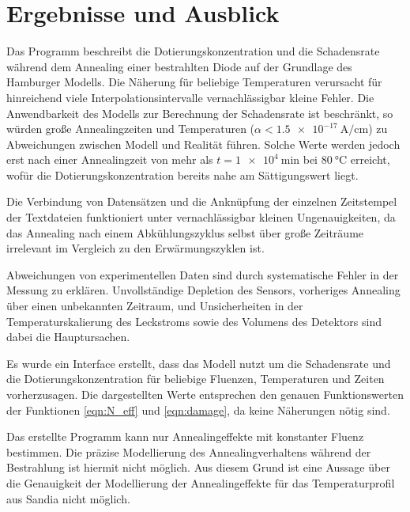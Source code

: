 \chapter{Ergebnisse und Ausblick}
Das Programm beschreibt die Dotierungskonzentration und die Schadensrate während dem
Annealing einer bestrahlten Diode
auf der Grundlage des Hamburger Modells. Die Näherung für beliebige
Temperaturen verursacht für hinreichend viele Interpolationsintervalle
vernachlässigbar kleine Fehler. Die Anwendbarkeit des Modells zur Berechnung der Schadensrate ist
beschränkt, so würden große Annealingzeiten und Temperaturen ($\alpha < \SI{1.5e-17}{\ampere\per\centi\meter}$) zu Abweichungen
zwischen Modell und Realität führen. Solche Werte werden jedoch erst nach
einer Annealingzeit von mehr als $t=\SI{1e4}{\minute}$ bei $\SI{80}{\celsius}$ erreicht, wofür
die Dotierungskonzentration bereits nahe am Sättigungswert liegt.

Die Verbindung von Datensätzen und die Anknüpfung der einzelnen Zeitstempel der
Textdateien funktioniert unter vernachlässigbar kleinen Ungenauigkeiten, da das Annealing
nach einem Abkühlungszyklus selbst über große Zeiträume irrelevant im Vergleich zu
den Erwärmungszyklen ist.

Abweichungen von experimentellen Daten sind durch systematische Fehler in der Messung
zu erklären. Unvollständige Depletion des Sensors, vorheriges Annealing über einen
unbekannten Zeitraum, und Unsicherheiten in der Temperaturskalierung des Leckstroms sowie
des Volumens des Detektors sind dabei die Hauptursachen.

Es wurde ein Interface erstellt, dass das Modell nutzt um die Schadensrate und die Dotierungskonzentration
für beliebige Fluenzen, Temperaturen und
Zeiten vorherzusagen. Die dargestellten Werte entsprechen den genauen Funktionswerten
der Funktionen \ref{eqn:N_eff} und \ref{eqn:damage}, da keine Näherungen nötig sind.


Das erstellte Programm kann nur Annealingeffekte mit konstanter Fluenz
bestimmen. Die präzise Modellierung des Annealingverhaltens während der Bestrahlung
ist hiermit nicht möglich.
Aus diesem Grund ist eine Aussage über die Genauigkeit der Modellierung der
Annealingeffekte für das Temperaturprofil aus Sandia nicht möglich.



